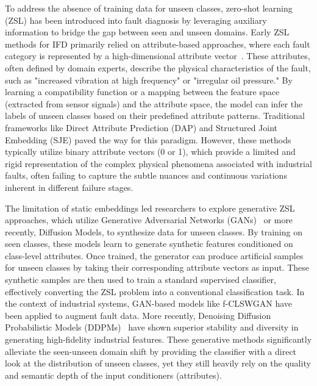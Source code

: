 To address the absence of training data for unseen classes, zero-shot learning (ZSL) has been introduced into fault diagnosis by leveraging auxiliary information to bridge the gap between seen and unseen domains. Early ZSL methods for IFD primarily relied on attribute-based approaches, where each fault category is represented by a high-dimensional attribute vector~\cite{lampert2009learning}. These attributes, often defined by domain experts, describe the physical characteristics of the fault, such as "increased vibration at high frequency" or "irregular oil pressure." By learning a compatibility function or a mapping between the feature space (extracted from sensor signals) and the attribute space, the model can infer the labels of unseen classes based on their predefined attribute patterns. Traditional frameworks like Direct Attribute Prediction (DAP) and Structured Joint Embedding (SJE) paved the way for this paradigm. However, these methods typically utilize binary attribute vectors (0 or 1), which provide a limited and rigid representation of the complex physical phenomena associated with industrial faults, often failing to capture the subtle nuances and continuous variations inherent in different failure stages.

The limitation of static embeddings led researchers to explore generative ZSL approaches, which utilize Generative Adversarial Networks (GANs)~\cite{goodfellow2014generative} or more recently, Diffusion Models, to synthesize data for unseen classes. By training on seen classes, these models learn to generate synthetic features conditioned on class-level attributes. Once trained, the generator can produce artificial samples for unseen classes by taking their corresponding attribute vectors as input. These synthetic samples are then used to train a standard supervised classifier, effectively converting the ZSL problem into a conventional classification task. In the context of industrial systems, GAN-based models like f-CLSWGAN have been applied to augment fault data. More recently, Denoising Diffusion Probabilistic Models (DDPMs)~\cite{ho2020denoising} have shown superior stability and diversity in generating high-fidelity industrial features. These generative methods significantly alleviate the seen-unseen domain shift by providing the classifier with a direct look at the distribution of unseen classes, yet they still heavily rely on the quality and semantic depth of the input conditioners (attributes).

